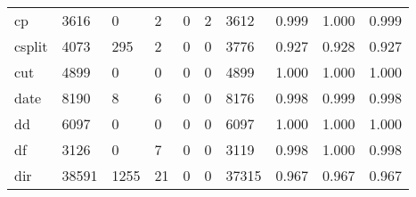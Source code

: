 \begin{longtable}{lp{1.3cm}p{1.3cm}p{1.3cm}p{1.3cm}p{1.3cm}p{1.3cm}p{1.3cm}p{1.3cm}p{1.3cm}}
cp        &                   3616 &                                  0 &                                 2 &                                0 &                                 2 &                            3612 &                                0.999 &                                  1.000 &                                0.999 \\
csplit    &                   4073 &                                295 &                                 2 &                                0 &                                 0 &                            3776 &                                0.927 &                                  0.928 &                                0.927 \\
cut       &                   4899 &                                  0 &                                 0 &                                0 &                                 0 &                            4899 &                                1.000 &                                  1.000 &                                1.000 \\
date      &                   8190 &                                  8 &                                 6 &                                0 &                                 0 &                            8176 &                                0.998 &                                  0.999 &                                0.998 \\
dd        &                   6097 &                                  0 &                                 0 &                                0 &                                 0 &                            6097 &                                1.000 &                                  1.000 &                                1.000 \\
df        &                   3126 &                                  0 &                                 7 &                                0 &                                 0 &                            3119 &                                0.998 &                                  1.000 &                                0.998 \\
dir       &                  38591 &                               1255 &                                21 &                                0 &                                 0 &                           37315 &                                0.967 &                                  0.967 &                                0.967 \\

\end{longtable}
